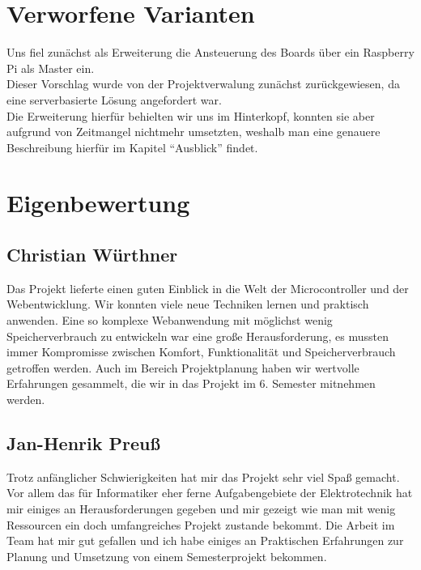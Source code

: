 \begin{table}[H]
\begin{tabular}{p{\textwidth}|l|l|lp{\textwidth}|} \hline



\end{tabular}
\end{table}

\section{Verworfene Varianten}
Uns fiel zunächst als Erweiterung die Ansteuerung des Boards über ein Raspberry Pi als Master ein.\\
Dieser Vorschlag wurde von der Projektverwalung zunächst zurückgewiesen, da eine serverbasierte Lösung
angefordert war. \\ Die Erweiterung hierfür behielten wir uns im Hinterkopf, konnten sie aber aufgrund 
von Zeitmangel nichtmehr umsetzten, weshalb man eine genauere Beschreibung hierfür im Kapitel "`Ausblick"'
findet.
\section{Eigenbewertung}


\subsection*{Christian Würthner}
Das Projekt lieferte einen guten Einblick in die Welt der Microcontroller und
der Webentwicklung. Wir konnten viele neue Techniken lernen und praktisch
anwenden. Eine so komplexe Webanwendung mit möglichst wenig Speicherverbrauch zu
entwickeln war eine große Herausforderung, es mussten immer Kompromisse zwischen
Komfort, Funktionalität und Speicherverbrauch getroffen werden. Auch im Bereich
Projektplanung haben wir wertvolle Erfahrungen gesammelt, die wir in das Projekt
im 6. Semester mitnehmen werden.

\subsection*{Jan-Henrik Preuß}
Trotz anfänglicher Schwierigkeiten hat mir das Projekt sehr viel Spaß gemacht.
Vor allem das für Informatiker eher ferne Aufgabengebiete der Elektrotechnik hat
mir einiges an Herausforderungen gegeben und mir gezeigt wie man mit wenig
Ressourcen ein doch umfangreiches Projekt zustande bekommt. Die Arbeit im Team 
hat mir gut gefallen und ich habe einiges an Praktischen Erfahrungen zur Planung
und Umsetzung von einem Semesterprojekt bekommen.

